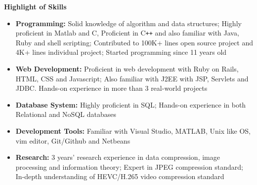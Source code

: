 \documentclass[letterpaper,10pt]{article}
\newcommand{\resheading}[1]{{\large \colorbox{mygrey}{\begin{minipage}{\textwidth}{\textbf{#1 \vphantom{p\^{E}}}}\end{minipage}}}}
\begin{document}
\resheading{Highlight of Skills}
\begin{itemize}
\itemsep0em
\item {\textbf {Programming:}} Solid knowledge of algorithm and data structures; Highly proficient in Matlab and C, Proficient in C{}\verb!++! and also familiar with Java, Ruby and shell scripting; Contributed to 100K+ lines open source project and 4K+ lines individual project; Started programming since 11 years old
\item{\textbf {Web Development:}} Proficient in web development with Ruby on Rails, HTML, CSS and Javascript; Also familiar with J2EE with JSP, Servlets and JDBC. Hands-on experience in more than 3 real-world projects
\item{\textbf {Database System:}} Highly proficient in SQL; Hands-on experience in both Relational and NoSQL databases
\item{\textbf {Development Tools:}} Familiar with Visual Studio, MATLAB, Unix like OS, vim editor, Git/Github and Netbeans
\item{\textbf {Research:}} 3 years' research experience in data compression, image processing and information theory; Expert in JPEG compression standard; In-depth understanding of HEVC/H.265 video compression standard

\end{itemize}
\end{document}
